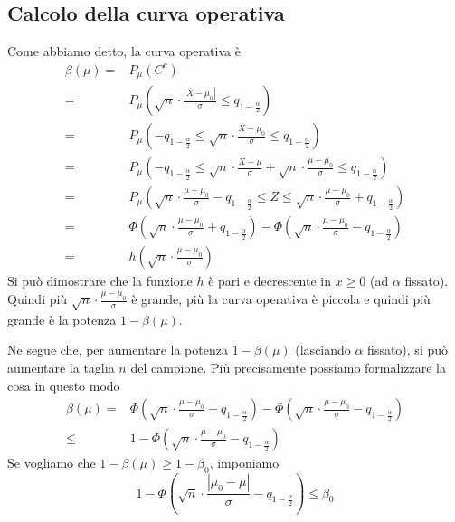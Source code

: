 \subsection{Calcolo della curva operativa}
Come abbiamo detto, la curva operativa è
\begin{align*}
	\beta (\mu) = & P_\mu (C^c)                                                         \\
	=             & P_\mu \left( \sqrt{n} \cdot \frac{|\bar{X} - \mu_0|}{\sigma}
	\leq q_{1 - \frac{\alpha}{2}} \right)                                               \\
	=             & P_\mu \left( -q_{1-\frac{\alpha}{2}} \leq
	\sqrt{n} \cdot \frac{\bar{X} - \mu_0}{\sigma} \leq q_{1 - \frac{\alpha}{2}} \right) \\
	=             & P_\mu \left( -q_{1-\frac{\alpha}{2}} \leq
	\sqrt{n} \cdot \frac{\bar{X} - \mu}{\sigma} + \sqrt{n} \cdot \frac{\mu - \mu_0}{\sigma}
	\leq q_{1-\frac{\alpha}{2}} \right)                                                 \\
	=             & P_\mu \left( \sqrt{n} \cdot \frac{\mu - \mu_0}{\sigma} -
	q_{1 - \frac{\alpha}{2}} \leq Z \leq
	\sqrt{n} \cdot \frac{\mu - \mu_0}{\sigma} + q_{1-\frac{\alpha}{2}} \right)          \\
	=             & \Phi \left( \sqrt{n} \cdot \frac{\mu - \mu_0}{\sigma} +
	q_{1-\frac{\alpha}{2}} \right) - \Phi \left( \sqrt{n} \cdot
	\frac{\mu - \mu_0}{\sigma} - q_{1-\frac{\alpha}{2}} \right)                         \\
	=             & h \left( \sqrt{n} \cdot \frac{\mu - \mu_0}{\sigma} \right)
\end{align*}
Si può dimostrare che la funzione $h$ è pari e decrescente in $x \geq 0$ (ad $\alpha$ fissato).
Quindi più $\sqrt{n} \cdot \frac{\mu - \mu_0}{\sigma}$ è grande, più la curva operativa è piccola
e quindi più grande è la potenza $1 - \beta(\mu)$.

Ne segue che, per aumentare la potenza $1 - \beta(\mu)$ (lasciando $\alpha$ fissato), si può
aumentare la taglia $n$ del campione. Più precisamente possiamo formalizzare la cosa in questo modo
\begin{align*}
	\beta (\mu) = & \Phi \left( \sqrt{n} \cdot \frac{\mu - \mu_0}{\sigma} +
	q_{1-\frac{\alpha}{2}} \right) - \Phi \left( \sqrt{n} \cdot
	\frac{\mu - \mu_0}{\sigma} - q_{1-\frac{\alpha}{2}} \right)                 \\
	\leq          & 1 - \Phi \left( \sqrt{n} \cdot \frac{\mu - \mu_0}{\sigma} -
	q_{1-\frac{\alpha}{2}} \right)
\end{align*}
Se vogliamo che $1-\beta(\mu) \geq 1 - \beta_0$, imponiamo
\[
	1 - \Phi \left( \sqrt{n} \cdot \frac{|\mu_0 - \mu|}{\sigma} -
	q_{1-\frac{\alpha}{2}} \right) \leq \beta_0
\]

